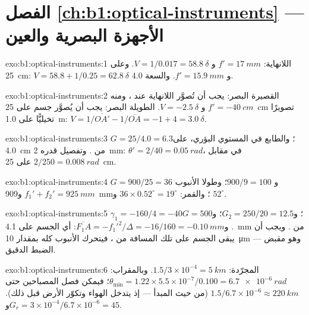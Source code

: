 \section*{الفصل \ref{ch:b1:optical-instruments} --- الأجهزة البصرية والعين}

\begin{solution}{exo:b1:optical-instruments:1}
اللانهاية: $f' = \qty{17}{mm}$ و $V = 1/0.017 = \qty{58.8}{\delta}$.
وعلى \qty{25}{cm}: $V = 58.8 + 1/0.25 = \qty{62.8}{\delta}$ و $f' = \qty{15.9}{mm}$.
والسعة \qty{4.0}{\delta}.
\end{solution}

\begin{solution}{exo:b1:optical-instruments:2}
 القصيرة البصر: يجب أن تُصوَّر اللانهاية عند ، ومنه $f' = \qty{-40}{cm}$ و
$V = \qty{-2.5}{\delta}$.  الطويلة البصر: يجب أن يُصوَّر جسم على \qty{25}{cm}
تصويرًا تخيليًّا على \qty{1.0}{m}: $V = 1/\overline{OA'} - 1/\overline{OA}
= -1 + 4 = \qty{+3.0}{\delta}$.
\end{solution}

\begin{solution}{exo:b1:optical-instruments:3}
$G = 25/4.0 = 6.3$؛ والطابع في المستوي البؤري، على \qty{4.0}{cm} من
. وتفصيل قدره \qty{2}{mm}: $\theta' = 2/40 = \qty{0.05}{rad}$، في مقابل
$2/250 = \qty{0.008}{rad}$ على \qty{25}{cm}.
\end{solution}

\begin{solution}{exo:b1:optical-instruments:4}
$G = 900/25 = 36$ و $900/9 = 100$؛ وطولا الأنبوب $f_1' + f_2' =
\qty{925}{mm}$ و\qty{909}{mm}؛ والقمر: $36 \times 0.52^\circ = 19^\circ$
و $52^\circ$.
\end{solution}

\begin{solution}{exo:b1:optical-instruments:5}
$\gamma_1 = -160/4 = -40$؛ و$G_2 = 250/20 = 12.5$؛ و$G = 500$.
و$\overline{F_1A} = -f_1'^2/\Delta = -16/160 = \qty{-0.10}{mm}$: أي الجسم على
\qty{4.1}{mm} من . ويجب أن يبقى الجسم على تلك المسافة
من ، فيتحرك الأنبوب كله بمقدار \qty{10}{\micro m} ---
وهو مقبض الضبط الدقيق.
\end{solution}

\begin{solution}{exo:b1:optical-instruments:6}
 المجرّدة: $1.5/3\times10^{-4} = \qty{5}{km}$. وبالمقراب: $\theta_{\min}
= 1.22 \times 5.5\times10^{-7}/0.100 = \qty{6.7e-6}{rad}$؛ فيمكن فصل
المصباحين حتى $1.5/6.7\times10^{-6} \approx \qty{220}{km}$ (من حيث
المبدأ --- إذ يتدخل الهواء وتكوّر الأرض قبل ذلك). و$G_r = 3\times10^{-4}/
6.7\times10^{-6} = 45$.
\end{solution}

